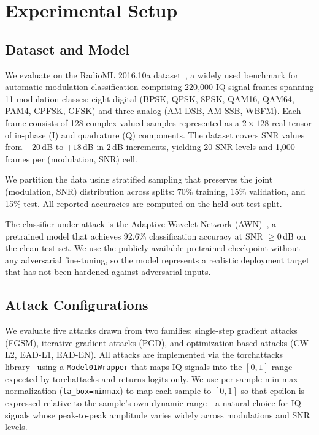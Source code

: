 \section{Experimental Setup}
\label{sec:setup}

\subsection{Dataset and Model}

We evaluate on the RadioML 2016.10a dataset~\cite{otoole2016rml}, a widely
used benchmark for automatic modulation classification comprising 220{,}000 IQ
signal frames spanning 11 modulation classes: eight digital (BPSK, QPSK, 8PSK,
QAM16, QAM64, PAM4, CPFSK, GFSK) and three analog (AM-DSB, AM-SSB, WBFM).
Each frame consists of 128 complex-valued samples represented as a $2\times128$
real tensor of in-phase (I) and quadrature (Q) components.  The dataset covers
SNR values from $-20$\,dB to $+18$\,dB in 2\,dB increments, yielding 20 SNR
levels and 1{,}000 frames per (modulation, SNR) cell.

We partition the data using stratified sampling that preserves the joint
(modulation, SNR) distribution across splits: 70\% training, 15\%
validation, and 15\% test.  All reported accuracies are computed on the
held-out test split.

The classifier under attack is the Adaptive Wavelet Network (AWN)~\cite{li2023awn},
a pretrained model that achieves 92.6\% classification accuracy at SNR $\geq 0$\,dB
on the clean test set.  We use the publicly available pretrained checkpoint without
any adversarial fine-tuning, so the model represents a realistic deployment target
that has not been hardened against adversarial inputs.

\subsection{Attack Configurations}

We evaluate five attacks drawn from two families: single-step gradient attacks
(FGSM), iterative gradient attacks (PGD), and optimization-based attacks
(CW-L2, EAD-L1, EAD-EN). All attacks are implemented via the torchattacks
library~\cite{kim2020torchattacks} using a \texttt{Model01Wrapper} that maps
IQ signals into the $[0,1]$ range expected by torchattacks and returns logits
only.  We use per-sample min-max normalization (\texttt{ta\_box=minmax}) to
map each sample to $[0,1]$ so that epsilon is expressed relative to the
sample's own dynamic range---a natural choice for IQ signals whose peak-to-peak
amplitude varies widely across modulations and SNR levels.

